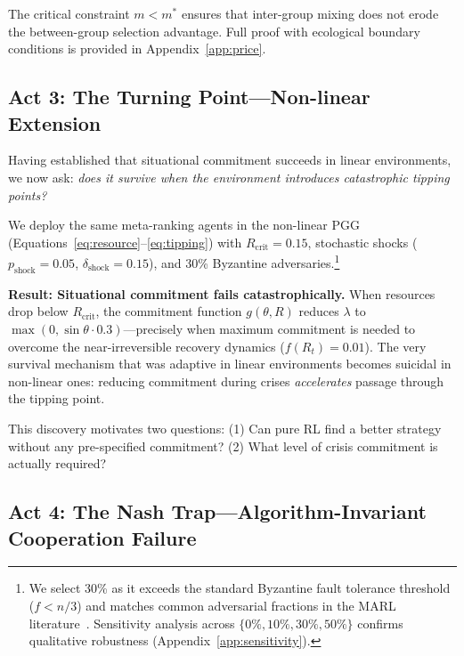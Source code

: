 \documentclass{article}
\begin{document}
\noindent The critical constraint $m < m^*$ ensures that inter-group mixing does not erode the between-group selection advantage.
Full proof with ecological boundary conditions is provided in Appendix~\ref{app:price}.

\subsection{Act 3: The Turning Point---Non-linear Extension}
\label{sec:turning_point}

Having established that situational commitment succeeds in linear environments, we now ask: \emph{does it survive when the environment introduces catastrophic tipping points?}

We deploy the same meta-ranking agents in the non-linear PGG (Equations~\ref{eq:resource}--\ref{eq:tipping}) with $R_{\text{crit}} = 0.15$, stochastic shocks ($p_{\text{shock}} = 0.05$, $\delta_{\text{shock}} = 0.15$), and 30\% Byzantine adversaries.\footnote{We select 30\% as it exceeds the standard Byzantine fault tolerance threshold ($f < n/3$) and matches common adversarial fractions in the MARL literature~\citep{lerer2017maintaining}. Sensitivity analysis across $\{0\%, 10\%, 30\%, 50\%\}$ confirms qualitative robustness (Appendix~\ref{app:sensitivity}).}

\textbf{Result: Situational commitment fails catastrophically.}
When resources drop below $R_{\text{crit}}$, the commitment function $g(\theta, R)$ reduces $\lambda$ to $\max(0, \sin\theta \cdot 0.3)$---precisely when maximum commitment is needed to overcome the near-irreversible recovery dynamics ($f(R_t) = 0.01$).
The very survival mechanism that was adaptive in linear environments becomes suicidal in non-linear ones: reducing commitment during crises \emph{accelerates} passage through the tipping point.

This discovery motivates two questions: (1) Can pure RL find a better strategy without any pre-specified commitment? (2) What level of crisis commitment is actually required?

\subsection{Act 4: The Nash Trap---Algorithm-Invariant Cooperation Failure}
\label{sec:nash_trap}
\end{document}

